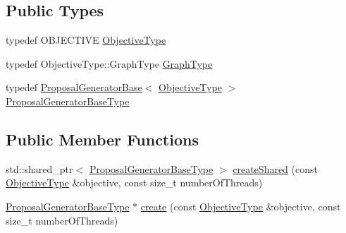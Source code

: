 \subsection*{Public Types}
\begin{DoxyCompactItemize}
\item 
typedef O\+B\+J\+E\+C\+T\+I\+V\+E \hyperlink{classnifty_1_1graph_1_1optimization_1_1common_1_1PyProposalGeneratorFactoryBase_a9449da0812d19e05891bdf7ec4fd58d4}{Objective\+Type}
\item 
typedef Objective\+Type\+::\+Graph\+Type \hyperlink{classnifty_1_1graph_1_1optimization_1_1common_1_1PyProposalGeneratorFactoryBase_a68150bf24a62de0fb75d6360841d8a1b}{Graph\+Type}
\item 
typedef \hyperlink{classnifty_1_1graph_1_1optimization_1_1common_1_1ProposalGeneratorBase}{Proposal\+Generator\+Base}$<$ \hyperlink{classnifty_1_1graph_1_1optimization_1_1common_1_1ProposalGeneratorFactoryBase_aa5736d89b93a428099cc2f867266c8c7}{Objective\+Type} $>$ \hyperlink{classnifty_1_1graph_1_1optimization_1_1common_1_1PyProposalGeneratorFactoryBase_a7cd8e337619fd5f5c42c797867af0e91}{Proposal\+Generator\+Base\+Type}
\end{DoxyCompactItemize}
\subsection*{Public Member Functions}
\begin{DoxyCompactItemize}
\item 
std\+::shared\+\_\+ptr$<$ \hyperlink{classnifty_1_1graph_1_1optimization_1_1common_1_1ProposalGeneratorFactoryBase_ac2be47e9c7b7a249b3d597831c50405d}{Proposal\+Generator\+Base\+Type} $>$ \hyperlink{classnifty_1_1graph_1_1optimization_1_1common_1_1PyProposalGeneratorFactoryBase_a27a9951d4cbf17168efb32a2d1416da3}{create\+Shared} (const \hyperlink{classnifty_1_1graph_1_1optimization_1_1common_1_1ProposalGeneratorFactoryBase_aa5736d89b93a428099cc2f867266c8c7}{Objective\+Type} \&objective, const size\+\_\+t number\+Of\+Threads)
\item 
\hyperlink{classnifty_1_1graph_1_1optimization_1_1common_1_1ProposalGeneratorFactoryBase_ac2be47e9c7b7a249b3d597831c50405d}{Proposal\+Generator\+Base\+Type} $\ast$ \hyperlink{classnifty_1_1graph_1_1optimization_1_1common_1_1PyProposalGeneratorFactoryBase_af5585e27587f91128620c14380e0d625}{create} (const \hyperlink{classnifty_1_1graph_1_1optimization_1_1common_1_1ProposalGeneratorFactoryBase_aa5736d89b93a428099cc2f867266c8c7}{Objective\+Type} \&objective, const size\+\_\+t number\+Of\+Threads)
\end{DoxyCompactItemize}


